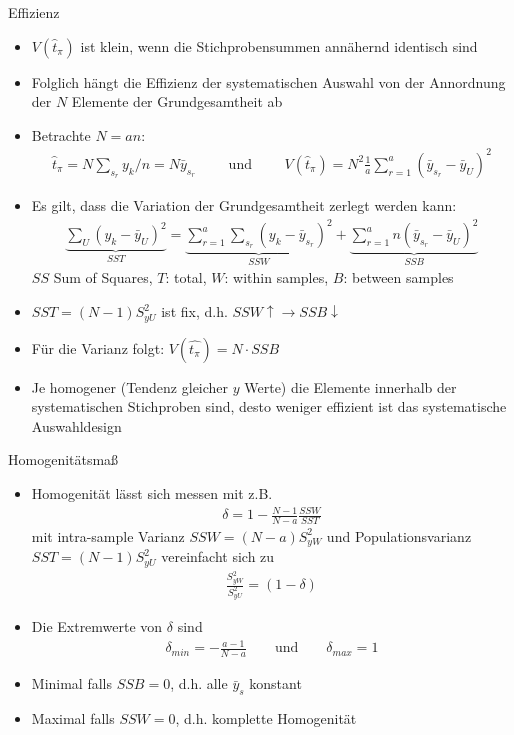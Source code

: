 \documentclass[9pt]{beamer}
\begin{document}
\begin{frame}{Effizienz}
\begin{itemize}
	\item $V(\hat{t}_\pi)$ ist klein, wenn die Stichprobensummen annähernd identisch sind
	\item Folglich hängt die Effizienz der systematischen Auswahl von der Annordnung der $N$ Elemente der Grundgesamtheit ab
	\item Betrachte $N=an$: 
	\begin{align*}
		\hat{t}_\pi = N\sum_{s_r}y_k/n = N \bar{y}_{s_r}\qquad \text{ und } \qquad 
		V(\hat{t}_\pi) = N^2 \frac{1}{a} \sum_{r=1}^a(\bar{y}_{s_r}-\bar{y}_U)^2
	\end{align*}
	\item Es gilt, dass die Variation der Grundgesamtheit zerlegt werden kann:
	\begin{align*}
	\underbrace{\sum_U(y_k - \bar{y}_U)^2}_{SST} = \underbrace{\sum_{r=1}^a\sum_{s_r}(y_k - \bar{y}_{s_r})^2}_{SSW} + \underbrace{\sum_{r=1}^a n(\bar{y}_{s_r}-\bar{y}_U)^2}_{SSB}
	\end{align*}
	$SS$ Sum of Squares, $T$: total, $W$: within samples, $B$: between samples
	\item $SST=(N-1)S_{yU}^2$ ist fix, d.h. $SSW \uparrow \rightarrow SSB \downarrow$
	\item Für die Varianz folgt: $V(\hat{t_\pi}) = N \cdot SSB$
	\item Je homogener (Tendenz gleicher $y$ Werte) die Elemente innerhalb der systematischen Stichproben sind, desto weniger effizient ist das systematische Auswahldesign
\end{itemize}
\end{frame}

\begin{frame}{Homogenitätsmaß}
\begin{itemize}
	\item Homogenität lässt sich messen mit z.B.
	\begin{align*}
	\delta = 1 - \frac{N-1}{N-a} \frac{SSW}{SST}
	\end{align*}
	mit intra-sample Varianz $SSW = (N-a)S_{yW}^2$ und Populationsvarianz $SST=(N-1)S_{yU}^2$ vereinfacht sich zu
	\begin{align*}
	\frac{S_{yW}^2}{S_{yU}^2} = (1-\delta)
	\end{align*}
	\item Die Extremwerte von $\delta$ sind
	\begin{align*}
	\delta_{min}=-\frac{a-1}{N-a} \qquad \text{und} \qquad \delta_{max} = 1
	\end{align*}
	\item Minimal falls $SSB=0$, d.h. alle $\bar{y}_s$ konstant
	\item Maximal falls $SSW=0$, d.h. komplette Homogenität
\end{itemize}
\end{frame}
\end{document}
